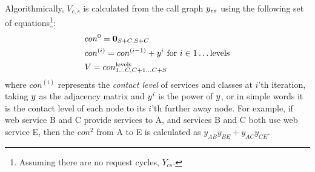  Algorithmically, $V_{c,s}$ is calculated from the call graph $y_{es}$ using the following set of equations\footnote{Assuming there are no request cycles, $Y_{cs}$.}:  
%
\begin{align} 
& con^0=\mathbf{0}_{S+C, S+ C} \label{eq: compute-adjacency-matrix}  \\
& con^{(i)}= con^{(i-1)}+ y^i  \text{ for } i \in 1\ldots \text{levels}   \nonumber \\ 
&V=con^\text{levels}_{1\ldots C, C+1\ldots C+S} \nonumber 
\end{align}  
where  $con^{(i)}$ represents the \textit{contact level} of services and classes at $i$'th iteration, taking $y$ as the adjacency matrix and $y^i$ is the power of $y$, or in simple words it is the contact level of each node to its $i$'th further away node.  
For example, if web service B and C provide services to A, and services B and C both use web service E, then the $con^2$ from A to E  is calculated as $y_{AB}y_{BE}+y_{AC}y_{CE}$.  

     
